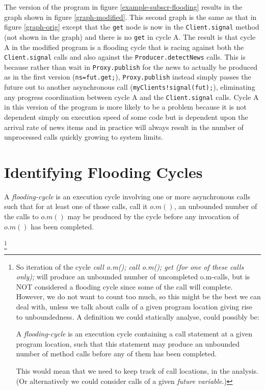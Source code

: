 \documentclass[12pt]{article}%
\begin{document}
The version of the program in figure \ref{example-subscr-flooding}
results in the graph shown in figure \ref{graph-modified}. This second graph is the same as that in figure \ref{graph-orig}
except that the \lstinline{get} node is now in the  \lstinline{Client.signal}
method (not shown in the graph) and there is no \lstinline{get} in cycle A. 
The result is that cycle A in the modified program
is a flooding cycle that is racing against both the
\lstinline{Client.signal} calls and also against the
\lstinline{Producer.detectNews} calls.  This is because rather than
wait in \lstinline{Proxy.publish} for the news to actually be produced
as in the first version (\lstinline{ns=fut.get;}),
\lstinline{Proxy.publish} instead simply passes the future out to
another asynchronous call (\lstinline{myClients!signal(fut);}),
eliminating any progress coordination between cycle A and the
\lstinline{Client.signal} calls. Cycle A in this version of the program is more likely to be a
problem because it is not dependent simply on execution speed of some
code but is dependent upon the arrival rate of news items and in
practice will always result in the number of unprocessed calls quickly
growing to system limits.

\section{Identifying Flooding Cycles}

\begin{definition}
\label{flooding-cycle}
A \emph{flooding-cycle} is an execution cycle 
involving one or more asynchronous calls
such that for at least one of those calls, call it $o.m()$,
an unbounded number of the calls to  $o.m()$ may be produced by the cycle
before any invocation of  $o.m()$ has been completed.
\end{definition}%

\footnote{So iteration of the cycle \emph{ call o.m(); call o.m(); get (for one of these calls only);} will produce an unbounded number of uncompleted o.m-calls, but is NOT considered a flooding cycle since some of the call will complete.
However, we do not want to count too much, so this might  be the best we can deal with, unless we talk about calls of a given  program location 
 giving rise to 
unboundedness. A definition we could statically analyse, could possibly be: 
\begin{definition}
\label{flooding-cycle2}
A \emph{flooding-cycle} is an execution cycle 
containing a call statement
 at a given program location, such that 
this statement may produce an unbounded number of  method calls  
before any of them %
 has been completed.
\end{definition}%
This would mean that we need to keep track of call locations,
in the analysis. (Or alternatively we could consider calls of a given  \emph{future variable}.)
}
\end{document}
